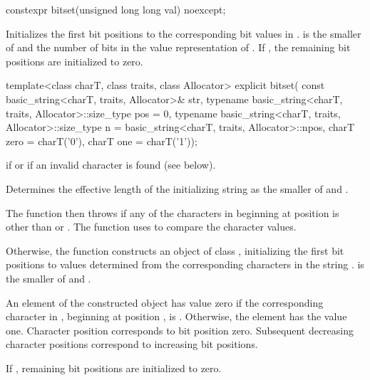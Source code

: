 %
\begin{itemdecl}
constexpr bitset(unsigned long long val) noexcept;
\end{itemdecl}

\begin{itemdescr}
\pnum
\effects
Initializes the first  bit positions to the corresponding bit
values in .
 is the smaller of  and the number of bits in the value
representation of .
If , the remaining bit positions are initialized to zero.
\end{itemdescr}

%
\begin{itemdecl}
template<class charT, class traits, class Allocator>
  explicit bitset(
    const basic_string<charT, traits, Allocator>& str,
    typename basic_string<charT, traits, Allocator>::size_type pos = 0,
    typename basic_string<charT, traits, Allocator>::size_type n
      = basic_string<charT, traits, Allocator>::npos,
    charT zero = charT('0'),
    charT one = charT('1'));
\end{itemdecl}

\begin{itemdescr}
\pnum
\throws
{}
if
or  if an invalid character is found (see below).%

\pnum
\effects
Determines the effective length
 of the initializing string as the smaller of
 and
.

The function then throws%
if any of the 
characters in  beginning at position  is
other than  or . The function uses 
to compare the character values.

Otherwise, the function constructs an object of class
,
initializing the first  bit
positions to values determined from the corresponding characters in the string
.
 is the smaller of  and .

\pnum
An element of the constructed object has value zero if the
corresponding character in , beginning at position
, is
.
Otherwise, the element has the value one.
Character position  corresponds to bit position zero.
Subsequent decreasing character positions correspond to increasing bit positions.

\pnum
If , remaining bit positions are initialized to zero.
\end{itemdescr}

